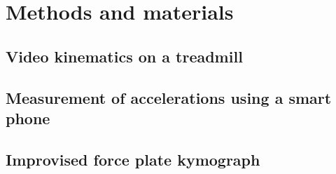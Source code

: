 \section{Methods and materials}

\subsection{Video kinematics on a treadmill}
\subsection{Measurement of accelerations using a smart phone}
\subsection{Improvised force plate kymograph}

